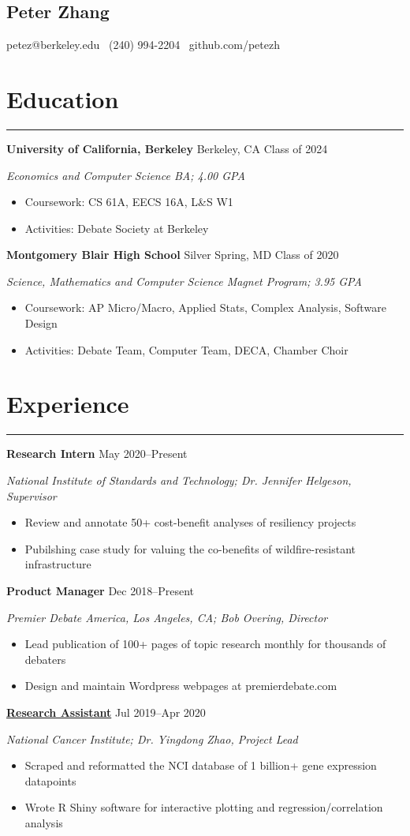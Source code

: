 \documentclass[11pt]{article}
\newcommand{\name}[1]{\begin{center}\section*{\huge \color{highlight} #1}\end{center}}
\newcommand{\topinfo}[1]{\begin{center}\vspace{-0.2cm}#1\vspace{-0.2cm}\end{center}}
\newcommand{\resumesection}[1]{\vspace{-0.3cm}\section*{\color{highlight}#1}\vspace{-0.3cm}\hrule\vspace{0.3cm}}
\begin{document}
\name{Peter Zhang}
\topinfo{petez@berkeley.edu \textbullet\ (240) 994-2204 \textbullet\ github.com/petezh}

\resumesection{Education}

\textbf{University of California, Berkeley} Berkeley, CA \hfill Class of 2024 \par
\textit{Economics and Computer Science BA; 4.00 GPA}
\begin{itemize}
	\item Coursework: CS 61A, EECS 16A, L\&S W1
	\item Activities: Debate Society at Berkeley
\end{itemize}

\textbf{Montgomery Blair High School} Silver Spring, MD \hfill Class of 2020 \par
\textit{Science, Mathematics and Computer Science Magnet Program; 3.95 GPA}

\begin{itemize}
	\item Coursework: AP Micro/Macro, Applied Stats, Complex Analysis, Software Design
	\item Activities: Debate Team, Computer Team, DECA, Chamber Choir
\end{itemize}

\resumesection{Experience}

\textbf{Research Intern} \hfill May 2020--Present \par
\textit{National Institute of Standards and Technology; Dr. Jennifer Helgeson, Supervisor}
\begin{itemize}
	\item Review and annotate 50+ cost-benefit analyses of resiliency projects
	\item Pubilshing case study for valuing the co-benefits of wildfire-resistant infrastructure
\end{itemize}\vspace{0.1cm}

\textbf{Product Manager} \hfill Dec 2018--Present \par
\textit{Premier Debate America, Los Angeles, CA; Bob Overing, Director}
\begin{itemize}
	\item Lead publication of 100+ pages of topic research monthly for thousands of debaters
	\item Design and maintain Wordpress webpages at premierdebate.com
\end{itemize}

\textbf{\href{https://github.com/petezh/TP-Workbench}{Research Assistant}} \hfill Jul 2019--Apr 2020 \par
\textit{National Cancer Institute; Dr. Yingdong Zhao, Project Lead}
\begin{itemize}
	\item Scraped and reformatted the NCI database of 1 billion+ gene expression datapoints
	\item Wrote R Shiny software for interactive plotting and regression/correlation analysis
\end{itemize}\vspace{0.1cm}
\end{document}
